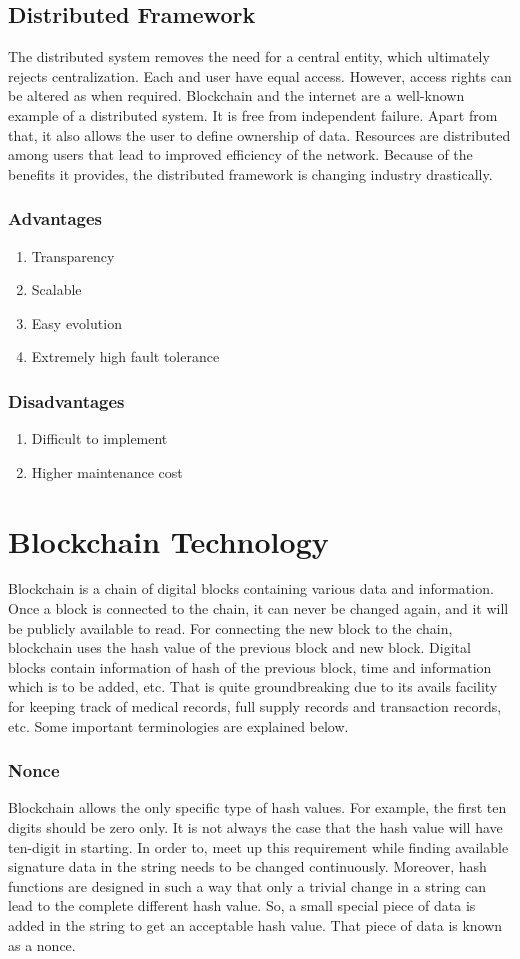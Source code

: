 \documentclass[a4paper,twoside,12pt]{report}
\begin{document}
\begin{spacing}{1.5}
\subsection{Distributed Framework}
The distributed system removes the need for a central entity, which ultimately rejects centralization. Each and user have equal access. However, access rights can be altered as when required. Blockchain and the internet are a well-known example of a distributed system. It is free from independent failure. Apart from that, it also allows the user to define ownership of data. Resources are distributed among users that lead to improved efficiency of the network. Because of the benefits it provides, the distributed framework is changing industry drastically.
\subsubsection{Advantages}
\begin{enumerate}
	\item{Transparency}
	\item{Scalable}
	\item{Easy evolution}
	\item{Extremely high fault tolerance}
\end{enumerate}
\subsubsection{Disadvantages}
\begin{enumerate}
	\item{Difficult to implement}
	\item{Higher maintenance cost}
\end{enumerate} 
\section{Blockchain Technology}
Blockchain is a chain of digital blocks containing various data and information. Once a block is connected to the chain, it can never be changed again, and it will be publicly available to read. For connecting the new block to the chain, blockchain uses the hash value of the previous block and new block. Digital blocks contain information of hash of the previous block, time and information which is to be added, etc. That is quite groundbreaking due to its avails facility for keeping track of medical records, full supply records and transaction records, etc. Some important terminologies are explained below.
\subsubsection{Nonce}
Blockchain allows the only specific type of hash values. For example, the first ten digits should be zero only. It is not always the case that the hash value will have ten-digit in starting. In order to, meet up this requirement while finding available signature data in the string needs to be changed continuously. Moreover, hash functions are designed in such a way that only a trivial change in a string can lead to the complete different hash value. So, a small special piece of data is added in the string to get an acceptable hash value. That piece of data is known as a nonce.   

\end{spacing}
\end{document}
